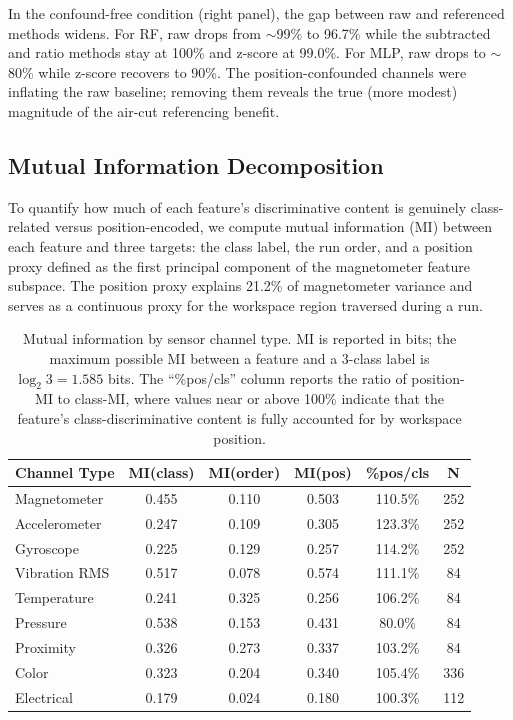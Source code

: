 In the confound-free condition (right panel), the gap between raw and referenced methods widens. For RF, raw drops from $\sim$99\% to 96.7\% while the subtracted and ratio methods stay at 100\% and z-score at 99.0\%. For MLP, raw drops to $\sim$80\% while z-score recovers to 90\%. The position-confounded channels were inflating the raw baseline; removing them reveals the true (more modest) magnitude of the air-cut referencing benefit.

\subsection{Mutual Information Decomposition}\label{sec:mi}

To quantify how much of each feature's discriminative content is genuinely class-related versus position-encoded, we compute mutual information (MI) between each feature and three targets: the class label, the run order, and a position proxy defined as the first principal component of the magnetometer feature subspace. The position proxy explains 21.2\% of magnetometer variance and serves as a continuous proxy for the workspace region traversed during a run.

\begin{table}[H]
\caption{Mutual information by sensor channel type. MI is reported in bits; the maximum possible MI between a feature and a 3-class label is $\log_2 3 = 1.585$ bits. The ``\%pos/cls'' column reports the ratio of position-MI to class-MI, where values near or above 100\% indicate that the feature's class-discriminative content is fully accounted for by workspace position.}\label{tab:mi_decomposition}
\centering
\begin{tabular}{lccccc}
\toprule
\textbf{Channel Type} & \textbf{MI(class)} & \textbf{MI(order)} & \textbf{MI(pos)} & \textbf{\%pos/cls} & \textbf{N} \\
\midrule
Magnetometer  & 0.455 & 0.110 & 0.503 & 110.5\% & 252 \\
Accelerometer & 0.247 & 0.109 & 0.305 & 123.3\% & 252 \\
Gyroscope     & 0.225 & 0.129 & 0.257 & 114.2\% & 252 \\
Vibration RMS & 0.517 & 0.078 & 0.574 & 111.1\% & 84 \\
Temperature   & 0.241 & 0.325 & 0.256 & 106.2\% & 84 \\
Pressure      & 0.538 & 0.153 & 0.431 & 80.0\%  & 84 \\
Proximity     & 0.326 & 0.273 & 0.337 & 103.2\% & 84 \\
Color         & 0.323 & 0.204 & 0.340 & 105.4\% & 336 \\
Electrical    & 0.179 & 0.024 & 0.180 & 100.3\% & 112 \\
\bottomrule
\end{tabular}
\end{table}

